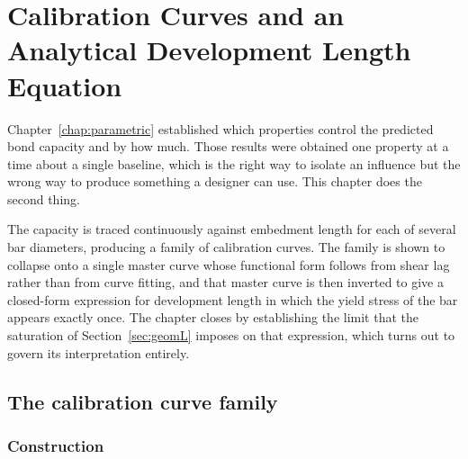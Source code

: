 %
%
%

\chapter{Calibration Curves and an Analytical Development Length
         Equation}
\label{chap:devlength}

Chapter~\ref{chap:parametric} established which properties control the
predicted bond capacity and by how much. Those results were obtained one
property at a time about a single baseline, which is the right way to
isolate an influence but the wrong way to produce something a designer can
use. This chapter does the second thing.

The capacity is traced continuously against embedment length for each of
several bar diameters, producing a family of calibration curves. The family
is shown to collapse onto a single master curve whose functional form
follows from shear lag rather than from curve fitting, and that master curve
is then inverted to give a closed-form expression for development length in
which the yield stress of the bar appears exactly once. The chapter closes
by establishing the limit that the saturation of
Section~\ref{sec:geomL} imposes on that expression, which turns out to
govern its interpretation entirely.


\section{The calibration curve family}
\label{sec:curvefamily}

\subsection{Construction}


